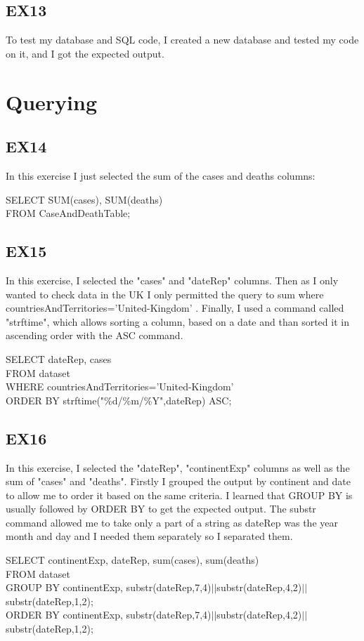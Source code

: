 \documentclass{article}
\begin{document}
\subsection{EX13}
To test my database and SQL code, I created a new database and tested my code on it, and I got the expected output.

\section{Querying}
\subsection{EX14}
In this exercise I just selected the sum of the cases and deaths columns:
\begin{algorithm}
SELECT SUM(cases), SUM(deaths) \\
FROM CaseAndDeathTable;
\end{algorithm} \newpage

\subsection{EX15}
In this exercise, I selected the "cases" and "dateRep" columns. Then as I only wanted to check data in the UK I only permitted the query to sum where countriesAndTerritories='United-Kingdom' . Finally, I used a command called "strftime", which allows sorting a column, based on a date and than sorted it in ascending order with the ASC command.
\begin{algorithm}
SELECT dateRep, cases \\
FROM dataset \\
WHERE countriesAndTerritories='United-Kingdom' \\
ORDER BY strftime("\%d/\%m/\%Y",dateRep) ASC;
\end{algorithm} \par

\subsection{EX16}
In this exercise, I selected the "dateRep", "continentExp" columns as well as the sum of "cases" and "deaths". Firstly I grouped the output by continent and date to allow me to order it based on the same criteria. I learned that GROUP BY is usually followed by ORDER BY to get the expected output. The substr command allowed me to take only a part of a string as dateRep was the year month and day and I needed them separately so I separated them.
\begin{algorithm}
SELECT continentExp, dateRep, sum(cases), sum(deaths) \\
FROM dataset \\
GROUP BY continentExp, substr(dateRep,7,4)$||$substr(dateRep,4,2)$||$substr(dateRep,1,2); \\
ORDER BY continentExp, substr(dateRep,7,4)$||$substr(dateRep,4,2)$||$substr(dateRep,1,2); 
\end{algorithm} \par
\end{document}
